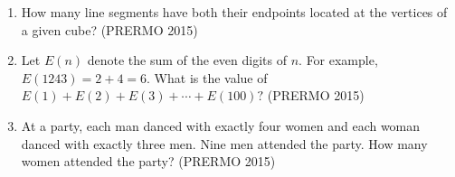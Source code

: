  \begin{enumerate}
 \item How many line segments have both their endpoints located at the vertices of a given cube? \hfill(PRERMO 2015)

    \item Let $E(n)$ denote the sum of the even digits of $n$. For example, $ E(1243) = 2 + 4 = 6 $. What is the value of $ E(1) + E(2) + E(3) + \cdots + E(100)? $ \hfill(PRERMO 2015)

    \item At a party, each man danced with exactly four women and each woman danced with exactly three men. Nine men attended the party. How many women attended the party? \hfill(PRERMO 2015)
    \end{enumerate}
